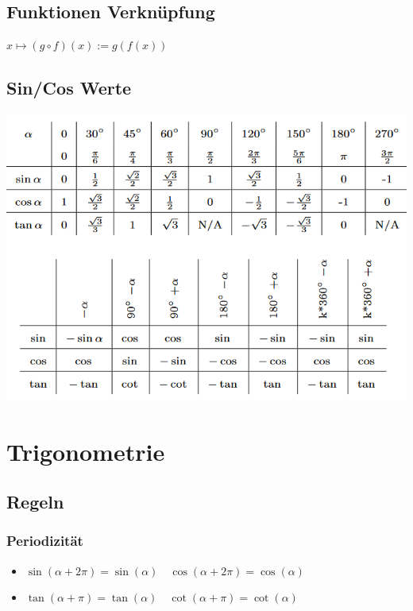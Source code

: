 \documentclass[8pt]{article}
\begin{document}
\begin{multicols*}{3}
\subsection{Funktionen Verknüpfung}

$
x \mapsto (g \circ f)(x) := g(f(x))
$

\subsection{Sin/Cos Werte}
\begin{center}
\includegraphics[scale=0.4]{values.png}
\end{center}


\section{Trigonometrie}

\subsection{Regeln}
\subsubsection{Periodizität}
\begin{itemize}
 \item $\sin(\alpha + 2 \pi) = \sin(\alpha) \quad \cos(\alpha + 2 \pi) = \cos(\alpha)$
 \item $\tan(\alpha + \pi) = \tan(\alpha) \quad \cot(\alpha + \pi) = \cot(\alpha)$
\end{itemize}


\end{multicols*}
\end{document}
